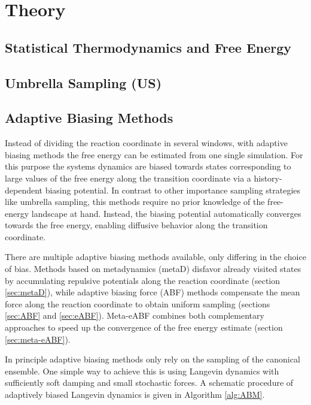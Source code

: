 \chapter{Theory}
\label{cha:theory}

\section{Statistical Thermodynamics and Free Energy}

\section{Umbrella Sampling (US)}
\label{sec:umbrella theory}

\section{Adaptive Biasing Methods}
\label{sec:adaptive biasing}

Instead of dividing the reaction coordinate in several windows, with adaptive biasing methods the free energy can be estimated from one single simulation. For this purpose the systems dynamics are biased towards states corresponding to large values of the free energy along the transition coordinate via a history-dependent biasing potential. In contrast to other importance sampling strategies like umbrella sampling, this methods require no prior knowledge of the free-energy landscape at hand. Instead, the biasing potential automatically converges towards the free energy, enabling diffusive behavior along the transition coordinate.

There are multiple adaptive biasing methods available, only differing in the choice of bias. Methods based on metadynamics (metaD) disfavor already visited states by accumulating repulsive potentials along the reaction coordinate (section \ref{sec:metaD}), while adaptive biasing force (ABF) methods compensate the mean force along the reaction coordinate to obtain uniform sampling (sections \ref{sec:ABF} and \ref{sec:eABF}). Meta-eABF combines both complementary approaches to speed up the convergence of the free energy estimate (section \ref{sec:meta-eABF}).

In principle adaptive biasing methods only rely on the sampling of the canonical ensemble. One simple way to achieve this is using Langevin dynamics with sufficiently soft damping and small stochastic forces. A schematic procedure of adaptively biased Langevin dynamics is given in Algorithm \ref{alg:ABM}.

